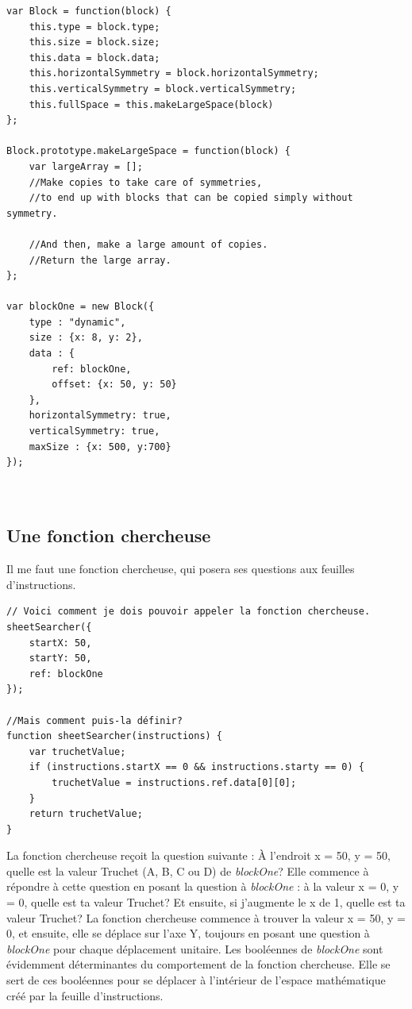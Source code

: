 \begin{lstlisting}
var Block = function(block) {
    this.type = block.type;
    this.size = block.size;
    this.data = block.data;
    this.horizontalSymmetry = block.horizontalSymmetry;
    this.verticalSymmetry = block.verticalSymmetry;
    this.fullSpace = this.makeLargeSpace(block)
};

Block.prototype.makeLargeSpace = function(block) {
    var largeArray = [];
    //Make copies to take care of symmetries,
    //to end up with blocks that can be copied simply without symmetry.

    //And then, make a large amount of copies.
    //Return the large array.
};

var blockOne = new Block({
    type : "dynamic",
    size : {x: 8, y: 2},
    data : {
        ref: blockOne,
        offset: {x: 50, y: 50}
    },
    horizontalSymmetry: true,
    verticalSymmetry: true,
    maxSize : {x: 500, y:700}
});



\end{lstlisting}
\subsection{Une fonction chercheuse}

Il me faut une fonction chercheuse, qui posera ses questions aux feuilles d'instructions.

\begin{lstlisting}
// Voici comment je dois pouvoir appeler la fonction chercheuse.
sheetSearcher({
    startX: 50,
    startY: 50,
    ref: blockOne
});

//Mais comment puis-la définir?
function sheetSearcher(instructions) {
    var truchetValue;
    if (instructions.startX == 0 && instructions.starty == 0) {
        truchetValue = instructions.ref.data[0][0];
    }
    return truchetValue;
}
\end{lstlisting}
La fonction chercheuse reçoit la question suivante : À l'endroit x = 50, y = 50, quelle est la valeur Truchet (A, B, C ou D) de \textit{blockOne}? Elle commence à répondre à cette question en posant la question à \textit{blockOne} : à la valeur x = 0, y = 0, quelle est ta valeur Truchet? Et ensuite, si j'augmente le x de 1, quelle est ta valeur Truchet? La fonction chercheuse commence à trouver la valeur x = 50, y = 0, et ensuite, elle se déplace sur l'axe Y, toujours en posant une question à \textit{blockOne} pour chaque déplacement unitaire. Les booléennes de \textit{blockOne} sont évidemment déterminantes du comportement de la fonction chercheuse. Elle se sert de ces booléennes pour se déplacer à l'intérieur de l'espace mathématique créé par la feuille d'instructions.

